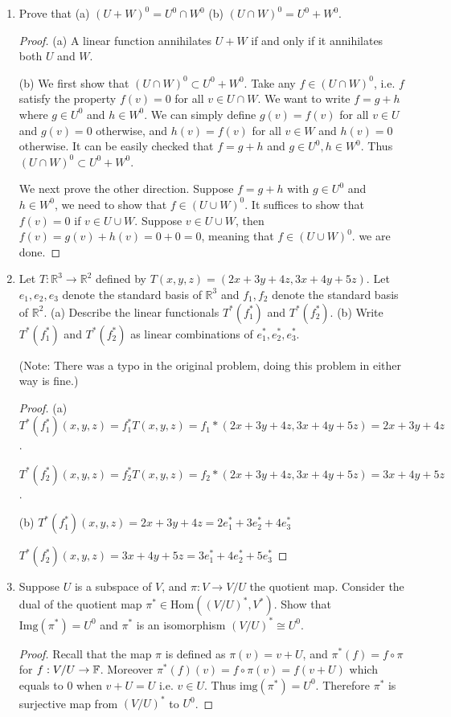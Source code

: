 \documentclass{amsart}
\begin{document}
\begin{enumerate}
\begin{proof}
	\end{proof}
		\item Prove that (a) $(U+W)^0=U^0\cap W^0 $ (b) $(U\cap W)^0=U^0+W^0$.
		\begin{proof}
			(a) A linear function annihilates $U+W$
 if and only if it annihilates both $U$
 and $W$.
 
 (b) We first show that $(U\cap W)^0\subset U^0+W^0$. Take any $f\in (U\cap W)^0$, i.e. $f$ satisfy the property $f(v)=0$ for all $v\in U\cap W$. We want to write $f=g+h$ where $g\in U^0$ and $h\in W^0$. We can simply define $g(v)=f(v)$ for all $v\in U$ and $g(v)=0$ otherwise, and $h(v)=f(v)$ for all $v\in W$ and $h(v)=0$ otherwise. It can be easily checked that $f=g+h$ and $g\in U^0,h\in W^0$. Thus $(U\cap W)^0\subset U^0+W^0$.
 
 We next prove the other direction. Suppose $f=g+h$ with $g\in U^0$ and $h\in W^0$, we need to show that $f\in (U\cup W)^0$. It suffices to show that $f(v)=0$ if $v\in U\cup W$. Suppose $v\in U\cup W$, then $f(v)=g(v)+h(v)=0
 +0=0$, meaning that $f\in (U\cup W)^0$. we are done.
  \end{proof}
		\item Let $T:\mathbb{R}^3\to \mathbb{R}^2$ defined by
$T(x,y,z) = (2x+3y+4z,3x+4y+5z)$. Let $e_1,e_2,e_3$ denote the standard basis of $\mathbb{R}^3$ and $f_1,f_2$ denote the standard basis of $\mathbb{R}^2$.
(a) Describe the linear functionals $T^*(f_1^*)$ and $T^*(f_2^*)$.
(b) Write $T^*(f_1^*)$ and $T^*(f_2^*)$ as linear combinations of $e_1^*,e_2^*,e_3^*$.

(Note: There was a typo in the original problem, doing this problem in either way is fine.)

\begin{proof}
	(a) $T^*(f_1^*)(x,y,z)=f_1^*T(x,y,z)=f_1*(2x+3y+4z,3x+4y+5z)=2x+3y+4z$.
	
	$T^*(f_2^*)(x,y,z)=f_2^*T(x,y,z)=f_2*(2x+3y+4z,3x+4y+5z)=3x+4y+5z$.
	
	(b) $T^*(f_1^*)(x,y,z)=2x+3y+4z=2e_1^*+3e_2^*+4e_3^*$
	
	$T^*(f_2^*)(x,y,z)=3x+4y+5z=3e_1^*+4e_2^*+5e_3^*$

	
\end{proof}
\item Suppose $U$ is a subspace of $V$, and $\pi:V\to V/U$ the quotient map. Consider the dual of the quotient map $\pi^*\in \text{Hom}((V/U)^*,V^*)$. Show that $\text{Img}(\pi^*)=U^0$ and $\pi^*$ is an isomorphism $(V/U)^*\cong U^0$.

\begin{proof}
	Recall that the map $\pi$ is defined as $\pi(v)=v+U$, and $\pi^*(f)=f\circ \pi$ for $f: V/U\to \mathbb{F}$. Moreover $\pi^*(f)(v)=f\circ \pi(v)=f(v+U)$ which equals to $0$ when $v+U=U$ i.e. $v\in U$. Thus $\text{img}(\pi^*)=U^0$. Therefore $\pi^*$ is surjective map from $(V/U)^*$ to $U^0$.
	

\end{proof}
\end{enumerate}
\end{document}
